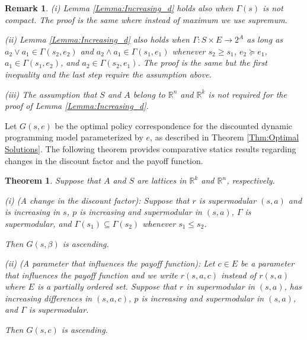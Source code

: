 \documentclass[letter,11pt]{article}
\newtheorem{theorem}{Theorem}[section]
\newtheorem{remark}{Remark}[section]
\begin{document}
\begin{remark}
    (i) Lemma \ref{Lemma:Increasing_d} holds also when $\Gamma(s)$ is not compact. The proof is the same where instead of maximum we use supremum.

    (ii) Lemma \ref{Lemma:Increasing_d} also holds when $\Gamma:S \times E \rightarrow 2^{A}$ as long as $a_{2} \lor a_{1} \in \Gamma(s_{2},e_{2})$ and $a_{2} \land a_{1} \in \Gamma(s_{1},e_{1})$ whenever $s_{2} \geq s_{1}$, $e_{2} \succeq e_{1}$, $a_{1} \in \Gamma(s_{1},e_{2})$, and $a_{2} \in \Gamma (s_{2},e_{1})$. The proof is the same but the first inequality and the last step require the assumption above. 

    (iii) The assumption that $S$ and $A$ belong to $\mathbb{R}^{n}$ and $\mathbb{R}^{k}$ is not required for the proof of Lemma \ref{Lemma:Increasing_d}. 
\end{remark}

Let \( G(s, e) \) be the optimal policy correspondence for the discounted dynamic programming model parameterized by \( e \), as described in Theorem \ref{Thm:Optimal Solutions}. The following theorem provides comparative statics results regarding changes in the discount factor and the payoff function.


\begin{theorem} \label{Thm:discount}
    Suppose that  $A$ and $S$ are lattices in $\mathbb{R}^{k}$ and $\mathbb{R}^{n}$, respectively. 

    
     (i) (A change in the discount factor):    Suppose that $r$ is supermodular $(s,a)$ and is increasing in $s$, $p$ is increasing and supermodular in $(s,a)$, $\Gamma$ is supermodular, and $\Gamma(s_{1}) \subseteq \Gamma(s_{2})$ whenever $s_{1} \leq s_{2}$. 
    
   Then $G(s,\beta)$ is ascending. 

(ii) (A parameter that influences the payoff function): Let $c \in E$ be a parameter that influences the payoff function and we write $r(s,a,c)$ instead of $r(s,a)$ where $E$ is a partially ordered set. 
Suppose that $r$ in supermodular in $(s,a)$, has increasing differences in $(s,a,c)$, $p$ is  increasing and supermodular in $(s,a)$, and $\Gamma$ is supermodular. 

Then $G(s,c)$ is ascending. 
\end{theorem}
\end{document}
